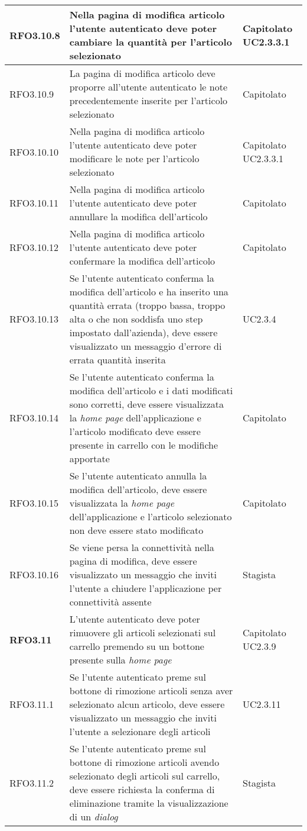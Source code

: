 {\begin{center}
\begin{longtable}{ | >{\centering\arraybackslash}p{2.5cm} | >{\arraybackslash}p{7cm} | >{\centering\arraybackslash}p{2cm} | }
RFO3.10.8 & Nella pagina di modifica articolo l'utente autenticato deve poter cambiare la quantità per l'articolo selezionato & Capitolato UC2.3.3.1 \\ \hline
RFO3.10.9 & La pagina di modifica articolo deve proporre all'utente autenticato le note precedentemente inserite per l'articolo selezionato & Capitolato \\ \hline
RFO3.10.10 & Nella pagina di modifica articolo l'utente autenticato deve poter modificare le note per l'articolo selezionato & Capitolato UC2.3.3.1 \\ \hline
RFO3.10.11 & Nella pagina di modifica articolo l'utente autenticato deve poter annullare la modifica dell'articolo & Capitolato \\ \hline
RFO3.10.12 & Nella pagina di modifica articolo l'utente autenticato deve poter confermare la modifica dell'articolo & Capitolato \\ \hline
RFO3.10.13 & Se l'utente autenticato conferma la modifica dell'articolo e ha inserito una quantità errata (troppo bassa, troppo alta o che non soddisfa uno step impostato dall'azienda), deve essere visualizzato un messaggio d'errore di errata quantità inserita & UC2.3.4 \\ \hline
RFO3.10.14 & Se l'utente autenticato conferma la modifica dell'articolo e i dati modificati sono corretti, deve essere visualizzata la \textit{home page} dell'applicazione e l'articolo modificato deve essere presente in carrello con le modifiche apportate & Capitolato \\ \hline
RFO3.10.15 & Se l'utente autenticato annulla la modifica dell'articolo, deve essere visualizzata la \textit{home page} dell'applicazione e l'articolo selezionato non deve essere stato modificato & Capitolato \\ \hline
RFO3.10.16 & Se viene persa la connettività nella pagina di modifica, deve essere visualizzato un messaggio che inviti l'utente a chiudere l'applicazione per connettività assente & Stagista \\ \hline
\textbf{RFO3.11} & L'utente autenticato deve poter rimuovere gli articoli selezionati sul carrello premendo su un bottone presente sulla \textit{home page} & Capitolato UC2.3.9 \\ \hline
RFO3.11.1 & Se l'utente autenticato preme sul bottone di rimozione articoli senza aver selezionato alcun articolo, deve essere visualizzato un messaggio che inviti l'utente a selezionare degli articoli & UC2.3.11 \\ \hline
RFO3.11.2 & Se l'utente autenticato preme sul bottone di rimozione articoli avendo selezionato degli articoli sul carrello, deve essere richiesta la conferma di eliminazione tramite la visualizzazione di un \textit{dialog} & Stagista \\ \hline

\end{longtable}
\end{center}}
